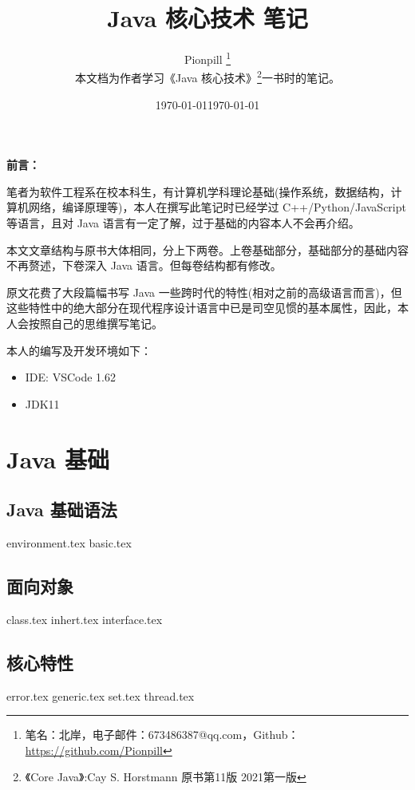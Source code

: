 \documentclass{PionpillNote-book}
\title{Java 核心技术 笔记}
\author{
    Pionpill \footnote{笔名：北岸，电子邮件：673486387@qq.com，Github：\url{https://github.com/Pionpill}} \\
    本文档为作者学习《Java 核心技术》\footnote{《Core Java》:Cay S. Horstmann 原书第11版 2021第一版}一书时的笔记。\\
}
\date{\today}
\begin{document}
\pagestyle{plain}
\maketitle

\noindent\textbf{前言：}

笔者为软件工程系在校本科生，有计算机学科理论基础(操作系统，数据结构，计算机网络，编译原理等)，本人在撰写此笔记时已经学过 C++/Python/JavaScript 等语言，且对 Java 语言有一定了解，过于基础的内容本人不会再介绍。

本文文章结构与原书大体相同，分上下两卷。上卷基础部分，基础部分的基础内容不再赘述，下卷深入 Java 语言。但每卷结构都有修改。

原文花费了大段篇幅书写 Java 一些跨时代的特性(相对之前的高级语言而言)，但这些特性中的绝大部分在现代程序设计语言中已是司空见惯的基本属性，因此，本人会按照自己的思维撰写笔记。

本人的编写及开发环境如下：
\begin{itemize}
    \item IDE: VSCode 1.62
    \item JDK11
\end{itemize}

\date{\today}
\newpage

\tableofcontents

\newpage

\setcounter{page}{1} 
\pagestyle{fancy}

\part{Java 基础}
\chapter{Java 基础语法}
{environment.tex} 
{basic.tex}
\chapter{面向对象}
{class.tex}
{inhert.tex}
{interface.tex}
\chapter{核心特性}
{error.tex}
{generic.tex}
{set.tex}
{thread.tex}
\end{document}

